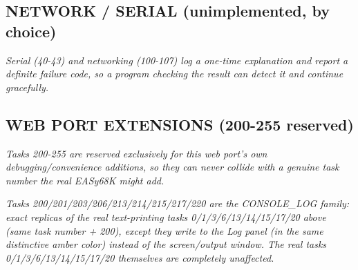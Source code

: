 \subsection*{NETWORK / SERIAL (unimplemented, by choice)}
\par\noindent\textit{Serial (40-43) and networking (100-107) log a one-time explanation and report a definite failure code, so a program checking the result can detect it and continue gracefully.}\par\medskip
\subsection*{WEB PORT EXTENSIONS (200-255 reserved)}
\par\noindent\textit{Tasks 200-255 are reserved exclusively for this web port's own debugging/convenience additions, so they can never collide with a genuine task number the real EASy68K might add.}\par\medskip
\par\noindent\textit{Tasks 200/201/203/206/213/214/215/217/220 are the CONSOLE\_LOG family: exact replicas of the real text-printing tasks 0/1/3/6/13/14/15/17/20 above (same task number + 200), except they write to the Log panel (in the same distinctive amber color) instead of the screen/output window. The real tasks 0/1/3/6/13/14/15/17/20 themselves are completely unaffected.}\par\medskip
